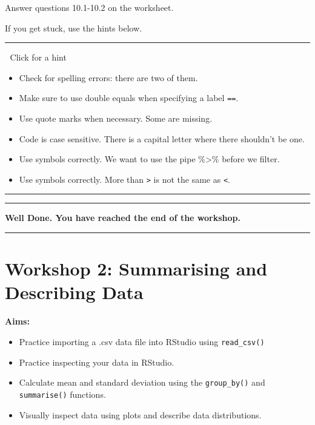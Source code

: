 \documentclass[
]{book}
\begin{document}
Answer questions 10.1-10.2 on the worksheet.

If you get stuck, use the hints below.

\begin{center}\rule{0.5\linewidth}{0.5pt}\end{center}

👀 Click for a hint

\begin{itemize}
\item
  Check for spelling errors: there are two of them.
\item
  Make sure to use double equals when specifying a label \texttt{==}.
\item
  Use quote marks when necessary. Some are missing.
\item
  Code is case sensitive. There is a capital letter where there shouldn't be one.
\item
  Use symbols correctly. We want to use the pipe \%\textgreater\% before we filter.
\item
  Use symbols correctly. More than \texttt{\textgreater{}} is not the same as \texttt{\textless{}}.
\end{itemize}

\begin{center}\rule{0.5\linewidth}{0.5pt}\end{center}

\begin{center}\rule{0.5\linewidth}{0.5pt}\end{center}

\textbf{Well Done. You have reached the end of the workshop.}

\begin{center}\rule{0.5\linewidth}{0.5pt}\end{center}

\chapter{Workshop 2: Summarising and Describing Data}\label{workshop-2-summarising-and-describing-data}

\textbf{Aims:}

\begin{itemize}
\item
  Practice importing a .csv data file into RStudio using \texttt{read\_csv()}
\item
  Practice inspecting your data in RStudio.
\item
  Calculate mean and standard deviation using the \texttt{group\_by()} and \texttt{summarise()} functions.
\item
  Visually inspect data using plots and describe data distributions.
\end{itemize}
\end{document}

